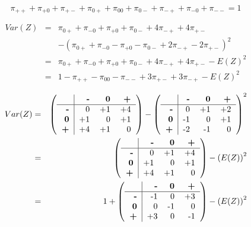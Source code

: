 \documentclass[12pt,a4paper,oneside]{book}
\begin{document}
\begin{equation}
\pi_{++} + \pi_{+0} + \pi_{+-} + \pi_{0+} + \pi_{00} + \pi_{0-} + \pi_{-+} + \pi_{-0} + \pi_{--} = 1 
\end{equation}

\begin{eqnarray}
Var(Z) &=& \pi_{0+} + \pi_{-0} + \pi_{+0} + \pi_{0-} +4\pi_{-+} +4\pi_{+-} \nonumber \nonumber \\ 
&&	- (\pi_{0+} + \pi_{-0} - \pi_{+0} - \pi_{0-} +2\pi_{-+} -2\pi_{+-})^2 \nonumber \\
&=& \pi_{0+} + \pi_{-0} + \pi_{+0} + \pi_{0-} +4\pi_{-+} +4\pi_{+-} - E(Z)^2 \nonumber \\
&=& 1 - \pi_{++} - \pi_{00} - \pi_{--} + 3\pi_{+-} + 3\pi_{-+} - E(Z)^2
\end{eqnarray}

\begin{eqnarray*}
Var(Z) &=& 
\left(\begin{tabular}{r|r r r}
    			& \textbf{-} & \textbf{0} & \textbf{+} \\\hline
    \textbf{-} 	& 0		& +1	& +4	\\
    \textbf{0} 	& +1	& 0		& +1	\\
    \textbf{+} 	& +4	& +1	& 0		\\
\end{tabular} \right)
- \left(
\begin{tabular}{r|r r r}
    			& \textbf{-} & \textbf{0} & \textbf{+} \\\hline
    \textbf{-} 	& 0		& +1	& +2	\\
    \textbf{0} 	& -1	& 0		& +1	\\
    \textbf{+} 	& -2	& -1	& 0		\\
\end{tabular}
\right)^2  \\
&=& \left( \begin{tabular}{r|r r r}
    			& \textbf{-} & \textbf{0} & \textbf{+} \\\hline
    \textbf{-} 	& 0		& +1	& +4	\\
    \textbf{0} 	& +1	& 0		& +1	\\
    \textbf{+} 	& +4	& +1	& 0		\\
\end{tabular} \right)
- \left(E(Z)\right)^2 	\\
&=& 1 +  \left(\begin{tabular}{r|r r r}
    			& \textbf{-} & \textbf{0} & \textbf{+} \\\hline
    \textbf{-} 	& -1	& 0		& +3	\\
    \textbf{0} 	& 0		& -1	& 0	\\
    \textbf{+} 	& +3	& 0		& -1		\\
\end{tabular} \right)
 - \left(E(Z)\right)^2	\\
\end{eqnarray*}
\end{document}
